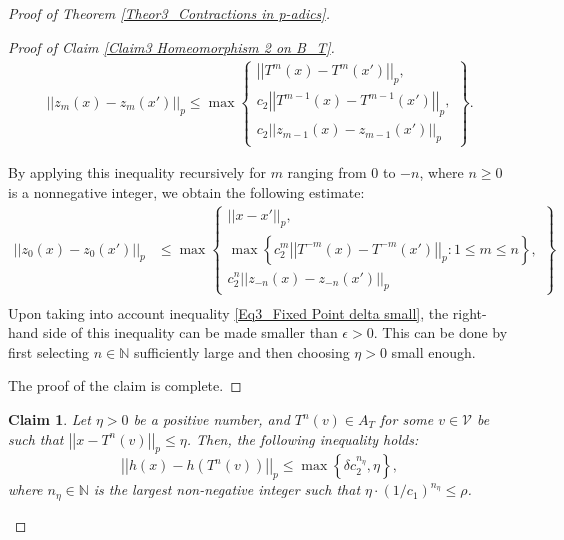 \documentclass[10pt,a4paper]{amsart}
\newtheorem{claim}{Claim}
\begin{document}
\begin{proof}[Proof of Theorem \ref{Theor3_Contractions in p-adics}]
\begin{proof}[Proof of Claim \ref{Claim3 Homeomorphism 2 on B_T}]
			\begin{align*} 
				\left| \left|  z_{m} \left(  x  \right)  - z_{m} \left(  x'  \right)   \right|  \right|_{p}   \le    \max \left\{  \begin{matrix}  \left| \left|  T^{m} \left(  x  \right)  - T^{m} \left(  x'  \right)   \right|  \right|_{p},  \\    c_{2}   \left| \left|  T^{m-1} \left(  x  \right)  - T^{m-1} \left(  x'  \right)   \right|  \right|_{p},  \\ 
					c_{2}  \left| \left|  z_{m-1} \left(  x  \right)  - z_{m-1} \left(  x'  \right)   \right|  \right|_{p} \end{matrix}  \right\}  .
			\end{align*}
			
			By applying this inequality recursively for $m$ ranging from $0$ to $-n$, where $n \ge 0$ is a nonnegative integer, we obtain the following estimate: 
			\begin{align*}
				\left| \left|  z_{0} \left(  x  \right)  - z_{0} \left(  x'  \right)   \right|  \right|_{p}   & \le    \max \left\{  \begin{matrix}   \left| \left|  x - x'  \right|  \right|_{p} ,  \\  
					\max \left\{   c_{2}^{m}  \left| \left|  T^{-m} \left(  x  \right)  - T^{-m} \left(  x'  \right)   \right|  \right|_{p} :   1 \le m \le n  \right\}  ,   \\  
					c_{2}^{n}  \left| \left|  z_{-n} \left(  x  \right)  - z_{-n} \left(  x'  \right)   \right|  \right|_{p} \end{matrix}  \right\}    \\ 
			\end{align*}
			Upon taking into account inequality \eqref{Eq3_Fixed Point delta small}, the right-hand side of this inequality can be made smaller than $ \epsilon  > 0$. This can be done by first selecting $n \in \mathbb{N} $ sufficiently large and then choosing $ \eta  > 0$ small enough. 
			
			The proof of the claim is complete. 
			
			
		\end{proof}
		
		
		\begin{claim}\label{Claim3 Homeomorphism 2 on A_T}
			Let $ \eta  > 0$ be a positive number, and  $T^{n} \left(  v  \right)  \in A_{T}$ for some $v \in \mathcal{V}$  be such that $ \left| \left|  x - T^{n} \left(  v  \right)   \right|  \right|_{p} \le  \eta $. Then, the following inequality holds:  
			$$   \left| \left|  h \left(  x  \right)   - h \left(  T^{n} \left(  v  \right)   \right)   \right|  \right|_{p}    \le     \max \left\{  \delta  c_{2}^{n_{ \eta}} ,    \eta  \right\}  ,$$
			where $n_{ \eta} \in \mathbb{N} $ is the largest non-negative integer such that $   \eta \cdot  \left(  1/ c_{1}  \right) ^{n_{ \eta}} \le \rho $. 
			

\end{claim}
\end{proof}
\end{document}
